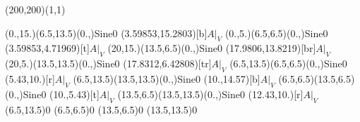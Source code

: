 \unitlength=1bp%

\begin{feynartspicture}(200,200)(1,1)

\FADiagram{}
\FAProp(0.,15.)(6.5,13.5)(0.,){Sine}{0}
\FALabel(3.59853,15.2803)[b]{$A|_V$}
\FAProp(0.,5.)(6.5,6.5)(0.,){Sine}{0}
\FALabel(3.59853,4.71969)[t]{$A|_V$}
\FAProp(20,15.)(13.5,6.5)(0.,){Sine}{0}
\FALabel(17.9806,13.8219)[br]{$A|_V$}
\FAProp(20,5.)(13.5,13.5)(0.,){Sine}{0}
\FALabel(17.8312,6.42808)[tr]{$A|_V$}
\FAProp(6.5,13.5)(6.5,6.5)(0.,){Sine}{0}
\FALabel(5.43,10.)[r]{$A|_V$}
\FAProp(6.5,13.5)(13.5,13.5)(0.,){Sine}{0}
\FALabel(10.,14.57)[b]{$A|_V$}
\FAProp(6.5,6.5)(13.5,6.5)(0.,){Sine}{0}
\FALabel(10.,5.43)[t]{$A|_V$}
\FAProp(13.5,6.5)(13.5,13.5)(0.,){Sine}{0}
\FALabel(12.43,10.)[r]{$A|_V$}
\FAVert(6.5,13.5){0}
\FAVert(6.5,6.5){0}
\FAVert(13.5,6.5){0}
\FAVert(13.5,13.5){0}
\end{feynartspicture}

